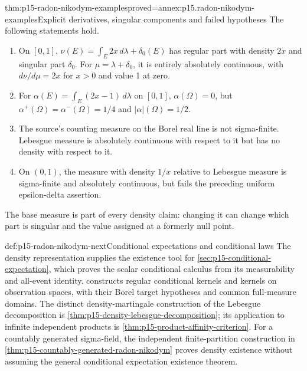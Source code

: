 \begin{hbtheorem}{thm:p15-radon-nikodym-examples}{proved=annex:p15.radon-nikodym-examples}{Explicit derivatives, singular components and failed hypotheses}
The following statements hold.
\begin{enumerate}
\item On \([0,1]\), \(\nu(E)=\int_E2x\,d\lambda+\delta_0(E)\)
      has regular part with density \(2x\) and singular part \(\delta_0\).
      For \(\mu=\lambda+\delta_0\), it is entirely absolutely continuous,
      with \(d\nu/d\mu=2x\) for \(x>0\) and value 1 at zero.
\item For \(\alpha(E)=\int_E(2x-1)\,d\lambda\) on \([0,1]\),
      \(\alpha(\Omega)=0\), but
      \(\alpha^+(\Omega)=\alpha^-(\Omega)=1/4\) and
      \(\lvert\alpha\rvert(\Omega)=1/2\).
\item The source's counting measure on the Borel real line is not
      sigma-finite. Lebesgue measure is absolutely continuous with respect
      to it but has no density with respect to it.
\item On \((0,1)\), the measure with density \(1/x\) relative to
      Lebesgue measure is sigma-finite and absolutely continuous, but
      fails the preceding uniform epsilon-delta assertion.
\end{enumerate}
The base measure is part of every density claim: changing it can change
which part is singular and the value assigned at a formerly null point.
\end{hbtheorem}

\begin{proofboundary}{def:p15-radon-nikodym-next}{Conditional expectations and conditional laws}
The density representation supplies the existence tool for
\cref{sec:p15-conditional-expectation}, which proves the scalar
conditional calculus from its measurability and all-event identity.
 constructs regular conditional
kernels and kernels on observation spaces, with their Borel target
hypotheses and common full-measure domains.
The distinct density-martingale construction of the Lebesgue decomposition
is \cref{thm:p15-density-lebesgue-decomposition}; its application to
infinite independent products is \cref{thm:p15-product-affinity-criterion}.
For a countably generated sigma-field, the independent finite-partition
construction in \cref{thm:p15-countably-generated-radon-nikodym}
proves density existence without assuming the general conditional
expectation existence theorem.
\end{proofboundary}
